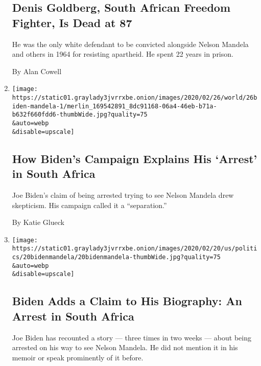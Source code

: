 \begin{enumerate}
{  \subsection{Denis Goldberg, South African Freedom Fighter, Is Dead at
  87}\label{denis-goldberg-south-african-freedom-fighter-is-dead-at-87}}

  He was the only white defendant to be convicted alongside Nelson
  Mandela and others in 1964 for resisting apartheid. He spent 22 years
  in prison.

  By Alan Cowell
\item
  \href{/2020/02/26/us/politics/joe-biden-arrest-mandela.html}{}

  \texttt{[image: https://static01.graylady3jvrrxbe.onion/images/2020/02/26/world/26biden-mandela-1/merlin\_169542891\_8dc91168-06a4-46eb-b71a-b632f660fdd6-thumbWide.jpg?quality=75\\\&auto=webp\\\&disable=upscale]}

  \hypertarget{how-bidens-campaign-explains-his-arrest-in-south-africa}{%
  \subsection{How Biden's Campaign Explains His `Arrest' in South
  Africa}\label{how-bidens-campaign-explains-his-arrest-in-south-africa}}

  Joe Biden's claim of being arrested trying to see Nelson Mandela drew
  skepticism. His campaign called it a ``separation.''

  By Katie Glueck
\item
  \href{/2020/02/21/us/politics/biden-south-africa-arrest-mandela.html}{}

  \texttt{[image: https://static01.graylady3jvrrxbe.onion/images/2020/02/20/us/politics/20bidenmandela/20bidenmandela-thumbWide.jpg?quality=75\\\&auto=webp\\\&disable=upscale]}

  \hypertarget{biden-adds-a-claim-to-his-biography-an-arrest-in-south-africa}{%
  \subsection{Biden Adds a Claim to His Biography: An Arrest in South
  Africa}\label{biden-adds-a-claim-to-his-biography-an-arrest-in-south-africa}}

  Joe Biden has recounted a story --- three times in two weeks --- about
  being arrested on his way to see Nelson Mandela. He did not mention it
  in his memoir or speak prominently of it before.


\end{enumerate}
